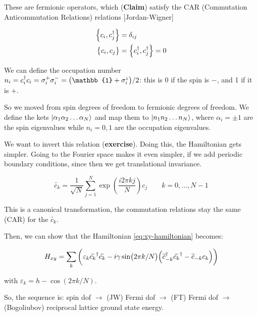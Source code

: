 \documentclass[main.tex]{subfiles}
\begin{document}
These are fermionic operators, which (\textbf{Claim})  satisfy the CAR (Commutation Anticommutation Relations) relations [Jordan-Wigner]

\begin{subequations}
\begin{align}
  \qty{c_i, c_j^\dag} &= \delta _{ij}   \\
  \qty{c_i, c_j} &= \qty{c_i^\dag, c_j^\dag} = 0
\end{align}
\end{subequations}

We can define the occupation number \(n_i = c_i^\dag c_i = \sigma_i^+ \sigma_i^- = \qty(\mathbb{1} + \sigma_i^z)/2\): this is 0 if the spin is \(-\), and 1 if it is \(+\).

So we moved from spin degrees of freedom to fermionic degrees of freedom. We define the kets \(\ket{\alpha_1 \alpha_2 \dots \alpha_N} \) and map them to \(\ket{n_1 n_2 \dots n_N} \), where \(\alpha_i = \pm 1\) are the spin eigenvalues while \(n_i = 0,1\) are the occupation eigenvalues.

We want to invert this relation (\textbf{exercise}). Doing this, the Hamiltonian gets simpler. Going to the Fourier space makes it even simpler, if we add periodic boundary conditions, since then we get translational invariance.

\begin{equation}
    \widetilde{c_k} = \frac{1}{\sqrt{N} } \sum _{j=1}   ^{N} \exp(\frac{i 2 \pi k j}{N}) c_j  \qquad k = 0, \dots, N-1
\end{equation}

\begin{claim}
This is a canonical transformation, the commutation relations stay the same (CAR) for the \(\widetilde{c_k} \).
\end{claim}

Then, we can show that the Hamiltonian \eqref{eq:xy-hamiltonian} becomes:

\begin{equation}
    H _{xy} = \sum _k \qty(\varepsilon_k \widetilde{c_k} ^\dag \widetilde{c_k} - i \gamma \sin(2 \pi k/N) \qty(\widetilde{c}_{-k}^\dag \widetilde{c_k}^\dag - \widetilde{c}_{-k} c_k))
\end{equation}

with \(\varepsilon_k = h - \cos(2 \pi k /N)\).

So, the sequence is: spin dof \(\rightarrow\) (JW) Fermi dof \(\rightarrow\) (FT) Fermi dof \(\rightarrow\) (Bogoliubov) reciprocal lattice ground state energy.
\end{document}
